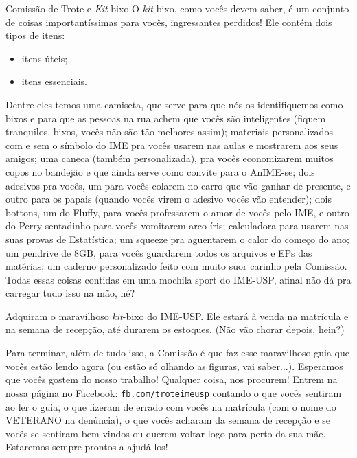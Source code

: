 \begin{secao}{Comissão de Trote e \textit{Kit}-bixo}
O \textit{kit}-bixo, como vocês devem saber, é um conjunto de coisas
importantíssimas para vocês, ingressantes perdidos! Ele contém dois tipos de
itens:
\begin{itemize}
\item itens úteis;
\item itens essenciais.
\end{itemize} %
Dentre eles temos uma camiseta, que serve para que nós os identifiquemos como
bixos e para que as pessoas na rua achem que vocês são inteligentes (fiquem
tranquilos, bixos, vocês não são tão melhores assim); materiais personalizados
com e sem o símbolo do IME pra vocês usarem nas aulas e mostrarem aos seus
amigos; uma caneca (também personalizada), pra vocês economizarem muitos copos
no bandejão e que ainda serve como convite para o AnIME-se; dois adesivos pra
vocês, um para vocês colarem no carro que vão ganhar de presente, e outro para
os papais (quando vocês virem o adesivo vocês vão entender); dois bottons, um
do Fluffy, para vocês professarem o amor de vocês pelo IME, e outro do Perry
sentadinho para vocês vomitarem arco-íris; calculadora para usarem nas suas
provas de Estatística; um squeeze pra aguentarem o calor do começo do ano; um
pendrive de 8GB, para vocês guardarem todos os arquivos e EPs das matérias; um
caderno personalizado feito com muito \sout{suor} carinho pela Comissão. Todas
essas coisas contidas em uma mochila sport do IME-USP, afinal não dá pra
carregar tudo isso na mão, né?

Adquiram o maravilhoso \textit{kit}-bixo do IME-USP. Ele estará à venda na
matrícula e na semana de recepção, até durarem os estoques. (Não vão chorar
depois, hein?)

Para terminar, além de tudo isso, a Comissão é que faz esse maravilhoso guia que
vocês estão lendo agora (ou estão só olhando as figuras, vai
saber...). Esperamos que vocês gostem do nosso trabalho! Qualquer coisa, nos
procurem! Entrem na nossa página no Facebook: {\tt fb.com/troteimeusp} contando
o que vocês sentiram ao ler o guia, o que fizeram de errado com vocês na
matrícula (com o nome do VETERANO na denúncia), o que vocês acharam da semana
de recepção e se vocês se sentiram bem-vindos ou querem voltar logo para perto
da sua mãe. Estaremos sempre prontos a ajudá-los!
\end{secao}
